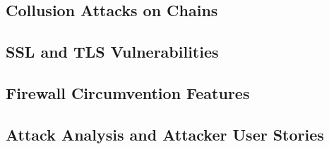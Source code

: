 \subsection{Collusion Attacks on Chains}
\label{sec:collusion-attacks}


\subsection{SSL and TLS Vulnerabilities}


\subsection{Firewall Circumvention Features}
\label{sec:evasion}


\subsection{Attack Analysis and Attacker User Stories}
\label{sec:attack-stories}

